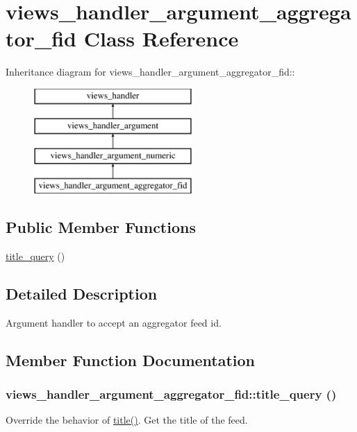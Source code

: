 \hypertarget{classviews__handler__argument__aggregator__fid}{
\section{views\_\-handler\_\-argument\_\-aggregator\_\-fid Class Reference}
\label{classviews__handler__argument__aggregator__fid}
}
Inheritance diagram for views\_\-handler\_\-argument\_\-aggregator\_\-fid::\begin{figure}[H]
\begin{center}
\leavevmode
\includegraphics[height=4cm]{classviews__handler__argument__aggregator__fid}
\end{center}
\end{figure}
\subsection*{Public Member Functions}
\begin{DoxyCompactItemize}
\item 
\hyperlink{classviews__handler__argument__aggregator__fid_a4d5f8aef22b4b3431c92fe2a496d9789}{title\_\-query} ()
\end{DoxyCompactItemize}


\subsection{Detailed Description}
Argument handler to accept an aggregator feed id. 

\subsection{Member Function Documentation}
\hypertarget{classviews__handler__argument__aggregator__fid_a4d5f8aef22b4b3431c92fe2a496d9789}{
\subsubsection[{title\_\-query}]{\setlength{\rightskip}{0pt plus 5cm}views\_\-handler\_\-argument\_\-aggregator\_\-fid::title\_\-query ()}}
\label{classviews__handler__argument__aggregator__fid_a4d5f8aef22b4b3431c92fe2a496d9789}
Override the behavior of \hyperlink{classviews__handler__argument__numeric_a480758dbcde899b5483b091e51e2bf39}{title()}. Get the title of the feed. 

